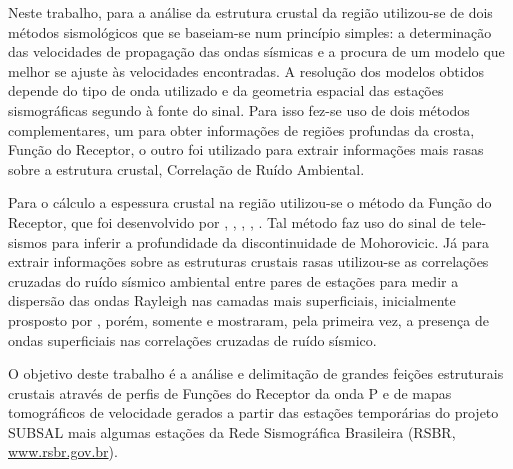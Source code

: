 Neste trabalho, para a análise da estrutura crustal da região utilizou-se de dois métodos sismológicos que se baseiam-se num princípio simples: a determinação das velocidades de propagação das ondas sísmicas e a procura de um modelo que melhor se ajuste às velocidades encontradas. A resolução dos modelos obtidos depende do tipo de onda utilizado e da geometria espacial das estações sismográficas segundo à fonte do sinal. Para isso fez-se uso de dois métodos complementares, um para obter informações de regiões profundas da crosta, Função do Receptor, o outro foi utilizado para extrair informações mais rasas sobre a estrutura crustal, Correlação de Ruído Ambiental.

Para o cálculo a espessura crustal na região utilizou-se o método da Função do Receptor, que foi desenvolvido por \cite{clayton_source_1976}, \cite{Langston_1977}, \cite{ammon_isolation_1991}, \cite{cassidy_numerical_1992}, \cite{Zhu_Kanamori_2000}. Tal método faz uso do sinal de tele-sismos para inferir a profundidade da discontinuidade de Mohorovicic. Já para extrair informações sobre as estruturas crustais rasas utilizou-se as correlações cruzadas do ruído sísmico ambiental entre pares de estações para medir a dispersão das ondas Rayleigh nas camadas mais superficiais, inicialmente prosposto por \cite{aki_space_1957}, porém, somente \cite{campillo_long-range_2003}  e \cite{shapiro_emergence_2004} mostraram, pela primeira vez, a  presença de ondas superficiais nas correlações cruzadas de ruído sísmico.

O objetivo deste trabalho é a análise e delimitação de grandes feições estruturais crustais através de perfis de Funções do Receptor da onda P e de mapas tomográficos de velocidade gerados a partir das estações temporárias do projeto SUBSAL mais algumas estações da Rede Sismográfica Brasileira (RSBR, \url{www.rsbr.gov.br}).